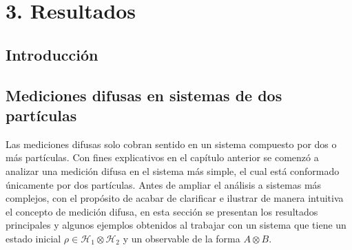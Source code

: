 \chapter[RESULTADOS]{3. Resultados}
\section{Introducción} %


\section{Mediciones difusas en sistemas de dos partículas} %


Las mediciones difusas solo cobran sentido en un sistema compuesto por dos o
más partículas. Con fines explicativos en el capítulo anterior se comenzó a
analizar una medición difusa en el sistema más simple, el cual está conformado
únicamente por dos partículas. Antes de ampliar el análisis a sistemas más
complejos, con el propósito de acabar de clarificar e ilustrar de manera
intuitiva el concepto de medición difusa, en esta sección se presentan los
resultados principales y algunos ejemplos obtenidos al trabajar con un sistema
que tiene un estado inicial $\rho \in \mathcal{H}_1\otimes \mathcal{H}_2$ y un
observable de la forma $A\otimes B$.\par



